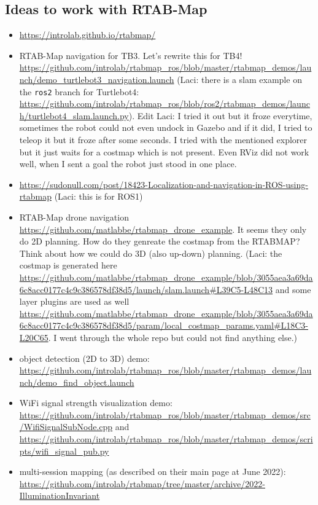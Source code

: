 \documentclass{article}
\begin{document}
\subsection{Ideas to work with RTAB-Map}
\begin{itemize}
\item \url{https://introlab.github.io/rtabmap/}
\item RTAB-Map navigation for TB3. Let's rewrite this for TB4! \url{
https://github.com/introlab/rtabmap_ros/blob/master/rtabmap_demos/launch/demo_turtlebot3_navigation.launch} (Laci: there is a slam example on the \verb|ros2| branch for Turtlebot4: \url{https://github.com/introlab/rtabmap_ros/blob/ros2/rtabmap_demos/launch/turtlebot4_slam.launch.py}). Edit Laci: I tried it out but it froze everytime, sometimes the robot could not even undock in Gazebo and if it did, I tried to teleop it but it froze after some seconds. I tried with the mentioned explorer but it just waits for a costmap which is not present. Even RViz did not work well, when I sent a goal the robot just stood in one place.

\item \url{https://sudonull.com/post/18423-Localization-and-navigation-in-ROS-using-rtabmap} (Laci: this is for ROS1)

\item RTAB-Map drone navigation \url{https://github.com/matlabbe/rtabmap_drone_example}. It seems they only do 2D planning. How do they genreate the costmap from the RTABMAP? Think about how we could do 3D (also up-down) planning. (Laci: the costmap is generated here \url{https://github.com/matlabbe/rtabmap_drone_example/blob/3055aea3a69da6c8acc0177c4c9c386578df38d5/launch/slam.launch#L39C5-L48C13} and some layer plugins are used as well \url{https://github.com/matlabbe/rtabmap_drone_example/blob/3055aea3a69da6c8acc0177c4c9c386578df38d5/param/local_costmap_params.yaml#L18C3-L20C65}. I went through the whole repo but could not find anything else.)

\item object detection (2D to 3D) demo: \url{https://github.com/introlab/rtabmap_ros/blob/master/rtabmap_demos/launch/demo_find_object.launch}
\item WiFi signal strength visualization demo: \url{https://github.com/introlab/rtabmap_ros/blob/master/rtabmap_demos/src/WifiSignalSubNode.cpp} and \url{https://github.com/introlab/rtabmap_ros/blob/master/rtabmap_demos/scripts/wifi_signal_pub.py}
\item multi-session mapping (as described on their main page at June 2022): \url{https://github.com/introlab/rtabmap/tree/master/archive/2022-IlluminationInvariant}
\end{itemize}
\end{document}
